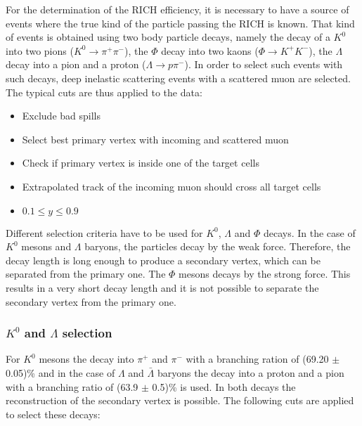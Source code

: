 For the determination of the RICH efficiency, it is necessary to have a source of events where the true kind of the particle passing the RICH is known. That kind of events
is obtained using two body particle decays, namely the decay of a $K^0$ into two pions ($K^0 \rightarrow \pi^+\pi^-$), the $\Phi$ decay into two kaons ($\Phi \rightarrow K^+K^-$),
the $\Lambda$ decay into a pion and a proton ($\Lambda \rightarrow p\pi^-$). In order to select such events with such decays, deep inelastic scattering events with a scattered muon
are selected. The typical cuts are thus applied to the data:
\begin{itemize}
  \item Exclude bad spills
  \item Select best primary vertex with incoming and scattered muon
  \item Check if primary vertex is inside one of the target cells
  \item Extrapolated track of the incoming muon should cross all target cells
  \item $0.1 \le y \le 0.9$
\end{itemize}

Different selection criteria have to be used for $K^0$, $\Lambda$ and $\Phi$ decays. In the case of $K^0$ mesons and $\Lambda$ baryons, the particles decay by the weak
force. Therefore, the decay length is long enough to produce a secondary vertex, which can be separated from the primary one. The $\Phi$ mesons decays by the strong force.
This results in a very short decay length and it is not possible to separate the secondary vertex from the primary one.

\subsubsection{$K^0$ and $\Lambda$ selection}

For $K^0$ mesons the decay into $\pi^+$ and $\pi^-$ with a branching ration of (69.20 $\pm$ 0.05)\% \cite{} and in the case of $\Lambda$ and $\bar{\Lambda}$ baryons the
decay into a proton and a pion with a branching ratio of (63.9 $\pm$ 0.5)\% \cite{} is used. In both decays the reconstruction of the secondary vertex is possible.
The following cuts are applied to select these decays:

